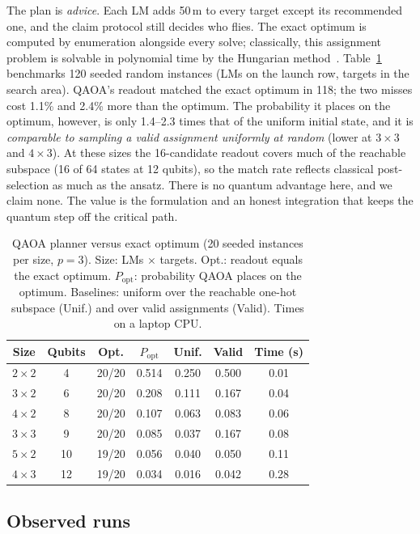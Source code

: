 \documentclass[conference]{IEEEtran}
\begin{document}
The plan is \emph{advice}. Each LM adds 50\,m to every target except its
recommended one, and the claim protocol still decides who flies. The exact
optimum is computed by enumeration alongside every solve; classically, this
assignment problem is solvable in polynomial time by the Hungarian
method~\cite{kuhn1955hungarian}. Table~\ref{tab:qaoa} benchmarks
120 seeded random instances (LMs on the launch row, targets in the search
area). QAOA's readout matched the exact optimum in 118; the two misses cost
1.1\% and 2.4\% more than the optimum. The probability it places on the
optimum, however, is only 1.4--2.3 times that of the uniform initial state,
and it is \emph{comparable to sampling a valid assignment uniformly at
random} (lower at $3\times3$ and $4\times3$). At these sizes the 16-candidate
readout covers much of the reachable subspace (16 of 64 states at 12
qubits), so the match rate reflects classical post-selection as much as the
ansatz. There is no quantum advantage here, and we claim none. The value is
the formulation and an honest integration that keeps the quantum step off the
critical path.

\begin{table}[t]
\caption{QAOA planner versus exact optimum (20 seeded instances per size,
$p=3$). Size: LMs $\times$ targets. Opt.: readout equals the exact optimum. $P_{\mathrm{opt}}$:
probability QAOA places on the optimum. Baselines: uniform over the reachable
one-hot subspace (Unif.) and over valid assignments (Valid). Times on a
laptop CPU.}
\label{tab:qaoa}
\centering
\footnotesize
\setlength{\tabcolsep}{4pt}
\begin{tabular}{@{}ccccccc@{}}
\toprule
Size & Qubits & Opt. & $P_{\mathrm{opt}}$ & Unif. & Valid & Time (s) \\
\midrule
$2\times2$ & 4  & 20/20 & 0.514 & 0.250 & 0.500 & 0.01 \\
$3\times2$ & 6  & 20/20 & 0.208 & 0.111 & 0.167 & 0.04 \\
$4\times2$ & 8  & 20/20 & 0.107 & 0.063 & 0.083 & 0.06 \\
$3\times3$ & 9  & 20/20 & 0.085 & 0.037 & 0.167 & 0.08 \\
$5\times2$ & 10 & 19/20 & 0.056 & 0.040 & 0.050 & 0.11 \\
$4\times3$ & 12 & 19/20 & 0.034 & 0.016 & 0.042 & 0.28 \\
\bottomrule
\end{tabular}
\end{table}

\subsection{Observed runs}
\end{document}
